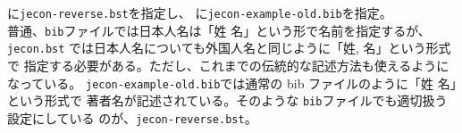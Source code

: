 \documentclass[article]{jlreq}
\begin{document}
\verb||に\verb|jecon-reverse.bst|を指定し、
\verb||に\verb|jecon-example-old.bib|を指定。
\vspace{1em}\\

普通、\verb|bib|ファイルでは日本人名は「姓 名」という形で名前を指定するが、
\verb|jecon.bst| では日本人名についても外国人名と同じように「姓, 名」という形式で
指定する必要がある。ただし、これまでの伝統的な記述方法も使えるようになっている。
\verb|jecon-example-old.bib|では通常の bib ファイルのように「姓 名」という形式で
著者名が記述されている。そのような \verb|bib|ファイルでも適切扱う設定にしている
のが、\verb|jecon-reverse.bst|。
\vspace{1em}\\



\nocite{*}


% 

%

\end{document}
